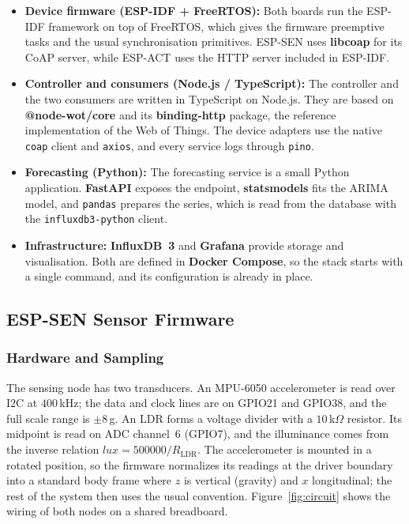 \documentclass[conference]{IEEEtran}
\begin{document}
\begin{itemize}
    \item \textbf{Device firmware (ESP-IDF + FreeRTOS):}
    Both boards run the ESP-IDF framework on top of FreeRTOS, which gives the firmware preemptive tasks and the usual synchronisation primitives. ESP-SEN uses \textbf{libcoap} for its CoAP server, while ESP-ACT uses the HTTP server included in ESP-IDF.

    \item \textbf{Controller and consumers (Node.js / TypeScript):}
    The controller and the two consumers are written in TypeScript on Node.js. They are based on \textbf{@node-wot/core} and its \textbf{binding-http} package, the reference implementation of the Web of Things. The device adapters use the native \texttt{coap} client and \texttt{axios}, and every service logs through \texttt{pino}.

    \item \textbf{Forecasting (Python):}
    The forecasting service is a small Python application. \textbf{FastAPI} exposes the endpoint, \textbf{statsmodels} fits the ARIMA model, and \texttt{pandas} prepares the series, which is read from the database with the \texttt{influxdb3-python} client.

    \item \textbf{Infrastructure:}
    \textbf{InfluxDB~3} and \textbf{Grafana} provide storage and visualisation. Both are defined in \textbf{Docker Compose}, so the stack starts with a single command, and its configuration is already in place.
\end{itemize}

\subsection{ESP-SEN Sensor Firmware}

\subsubsection{Hardware and Sampling}
The sensing node has two transducers. An MPU-6050 accelerometer is read over I2C at $400$\,kHz; the data and clock lines are on GPIO21 and GPIO38, and the full scale range is $\pm 8$\,g. An LDR forms a voltage divider with a $10$\,k$\Omega$ resistor. Its midpoint is read on ADC channel~6 (GPIO7), and the illuminance comes from the inverse relation $\mathit{lux} = 500000 / R_{\mathrm{LDR}}$. The accelerometer is mounted in a rotated position, so the firmware normalizes its readings at the driver boundary into a standard body frame where $z$ is vertical (gravity) and $x$ longitudinal; the rest of the system then uses the usual convention. Figure~\ref{fig:circuit} shows the wiring of both nodes on a shared breadboard.
\end{document}

